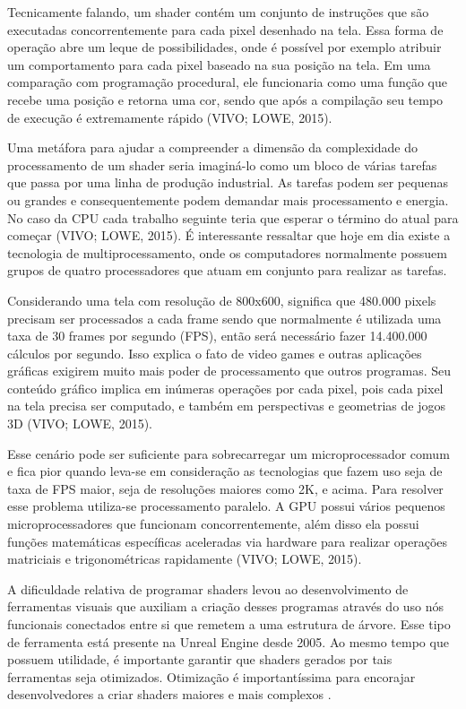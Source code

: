 Tecnicamente falando, um shader contém um conjunto de instruções que são executadas concorrentemente para cada pixel desenhado na tela. Essa forma de operação abre um leque de possibilidades, onde é possível por exemplo atribuir um comportamento para cada pixel baseado na sua posição na tela. Em uma comparação com programação procedural, ele funcionaria como uma função que recebe uma posição e retorna uma cor, sendo que após a compilação seu tempo de execução é extremamente rápido (VIVO; LOWE, 2015)\nocite{bookOfShaders}.

Uma metáfora para ajudar a compreender a dimensão da complexidade do processamento de um shader seria imaginá-lo como um bloco de várias tarefas que passa por uma linha de produção industrial. As tarefas podem ser pequenas ou grandes e consequentemente podem demandar mais processamento e energia. No caso da CPU cada trabalho seguinte teria que esperar o término do atual para começar (VIVO; LOWE, 2015)\nocite{bookOfShaders}. É interessante ressaltar que hoje em dia existe a tecnologia de multiprocessamento, onde os computadores normalmente possuem grupos de quatro processadores que atuam em conjunto para realizar as tarefas.

Considerando uma tela com resolução de 800x600, significa que 480.000 pixels precisam ser processados a cada frame sendo que normalmente é utilizada uma taxa de 30 frames por segundo (\acrshort{FPS}), então será necessário fazer 14.400.000 cálculos por segundo. Isso explica o fato de video games e outras aplicações gráficas exigirem muito mais poder de processamento que outros programas. Seu conteúdo gráfico implica em inúmeras operações por cada pixel, pois cada pixel na tela precisa ser computado, e também em perspectivas e geometrias de jogos 3D (VIVO; LOWE, 2015)\nocite{bookOfShaders}.  

Esse cenário pode ser suficiente para sobrecarregar um microprocessador comum e fica pior quando leva-se em consideração as tecnologias que fazem uso seja de taxa de FPS maior, seja de resoluções maiores como 2K, e acima. Para resolver esse problema utiliza-se processamento paralelo. A GPU possui vários pequenos microprocessadores que funcionam concorrentemente, além disso ela possui funções matemáticas específicas aceleradas via hardware para realizar operações matriciais e trigonométricas rapidamente (VIVO; LOWE, 2015)\nocite{bookOfShaders}.

A dificuldade relativa de programar shaders levou ao desenvolvimento de ferramentas visuais que auxiliam a criação desses programas através do uso nós funcionais conectados entre si que remetem a uma estrutura de árvore. Esse tipo de ferramenta está presente na Unreal Engine desde 2005. Ao mesmo tempo que possuem utilidade, é importante garantir que shaders gerados por tais ferramentas seja otimizados. Otimização é importantíssima para encorajar desenvolvedores a criar shaders maiores e mais complexos \cite{jensen2007shader}.

